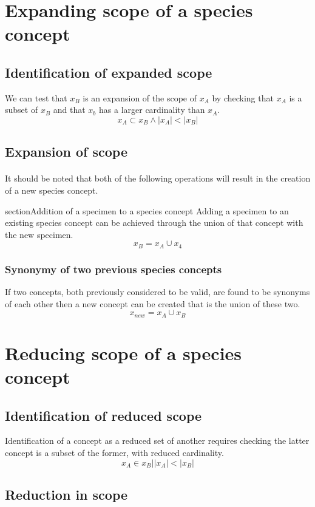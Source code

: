 \documentclass{article}
\begin{document}
   \section{Expanding scope of a species concept}
   \subsection{Identification of expanded scope}
   We can test that $x_B$ is an expansion of the scope of $x_A$ by checking that $x_A$ is a subset of $x_B$ and that $x_b$ has a larger cardinality than $x_A$.
   \[x_A \subset x_B \land \left|x_A\right| < \left|x_B\right|\]
   
   \subsection{Expansion of scope}
   \paragraph{}
   It should be noted that both of the following operations will result in the creation of a new species concept.
   
   
   section{Addition of a specimen to a species concept}
   Adding a specimen to an existing species concept can be achieved through the union of that concept with the new specimen.
   \[x_B = x_A \cup x_4\]
   
   \subsubsection{Synonymy of two previous species concepts}
   If two concepts, both previously considered to be valid, are found to be synonyms of each other then a new concept can be created that is the union of these two.
   \[x_{new}=x_A \cup x_B\]
   
   \section{Reducing scope of a species concept}
   \subsection{Identification of reduced scope}
   Identification of a concept as a reduced set of another requires checking the latter concept is a subset of the former, with reduced cardinality.
   \[x_A \in x_B|\left|x_A\right| < \left|x_B\right|\]
   \subsection{Reduction in scope}
\end{document}
